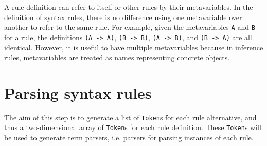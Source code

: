 A rule definition can refer to itself or other rules by their metavariables. In the definition of syntax rules, there is no difference using one metavariable over another to refer to the same rule. For example, given the metavariables \lstinline{A} and \lstinline{B} for a rule, the definitions \lstinline{(A -> A)}, \lstinline{(B -> B)}, \lstinline{(A -> B)}, and \lstinline{(B -> A)} are all identical. However, it is useful to have multiple metavariables because in inference rules, metavariables are treated as names representing concrete objects.

\section{Parsing syntax rules}
\label{syntax:parsing}
The aim of this step is to generate a list of \lstinline{Token}s for each rule alternative, and thus a two-dimensional array of \lstinline{Token}s for each rule definition. These \lstinline{Token}s will be used to generate term parsers, i.e. parsers for parsing instances of each rule.

